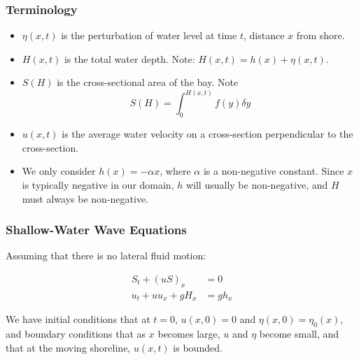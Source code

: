 	\begin{frame}
		\frametitle{Terminology}
		\begin{itemize}
			\item $\eta(x,t)$ is the perturbation of water level at time $t$, distance $x$ from shore.
			\item $H(x,t)$ is the total water depth. Note: $H(x,t) = h(x) + \eta(x,t)$.
			\item $S(H)$ is the cross-sectional area of the bay. Note
				\[ S(H) = \int_0^{H(x,t)} f(y) \delta y \]
			\item $u(x,t)$ is the average water velocity on a cross-section perpendicular to the cross-section.
			\item We only consider $h(x) = -\alpha x$, where $\alpha$ is a non-negative constant. Since $x$ is typically negative in our domain, $h$ will usually be non-negative, and $H$ must always be non-negative.
		\end{itemize}
	\end{frame}
	\begin{frame}
		\frametitle{Shallow-Water Wave Equations}
		Assuming that there is no lateral fluid motion:
		\begin{framed} \begin{align}
			\label{swe1} S_t + (uS)_x &= 0\\
			\label{swe2} u_t + u u_x + g H_x &= g h_x
		\end{align} \end{framed}
		We have initial conditions that at $t=0$, $u(x,0) = 0$ and $\eta(x,0) = \eta_0(x)$, and boundary conditions that as $x$ becomes large, $u$ and $\eta$ become small, and that at the moving shoreline, $u(x,t)$ is bounded.
	\end{frame}


